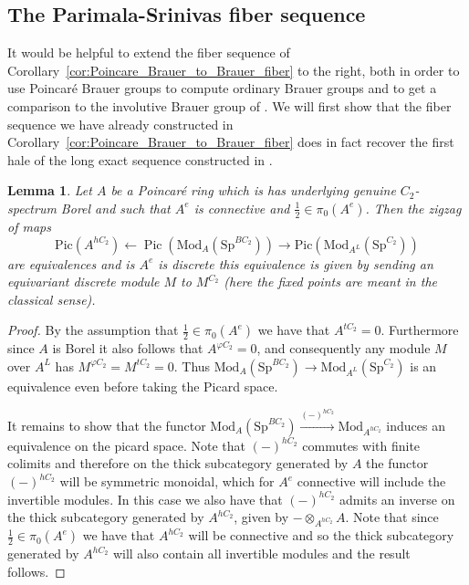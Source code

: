 \documentclass{article}
\DeclareMathOperator{\Pic}{Pic} %
\renewcommand{\phi}{\varphi}
\newcommand{\pic}{\ensuremath{\mathrm{Pic}}}
\newtheorem{lemma}[equation]{Lemma}
\theoremstyle{definition}
\begin{document}
\subsection{The Parimala-Srinivas fiber sequence}

It would be helpful to extend the fiber sequence of Corollary~\ref{cor:Poincare_Brauer_to_Brauer_fiber} to the right, both in order to use Poincar{\'e} Brauer groups to compute ordinary Brauer groups and to get a comparison to the involutive Brauer group of \cite{MR1162189}. We will first show that the fiber sequence we have already constructed in Corollary~\ref{cor:Poincare_Brauer_to_Brauer_fiber} does in fact recover the first hale of the long exact sequence constructed in \cite[Theorem 2]{MR1162189}.

\begin{lemma}
    Let $A$ be a Poincar{\'e} ring which is has underlying genuine $C_2$-spectrum Borel and such that $A^e$ is connective and $\frac{1}{2}\in \pi_0(A^e)$. Then the zigzag of maps \[\pic(A^{hC_2})\leftarrow \Pic(\mathrm{Mod}_{A}(\mathrm{Sp}^{BC_2}))\rightarrow \pic(\mathrm{Mod}_{A^L}(\mathrm{Sp}^{C_2}))\] are equivalences and is $A^e$ is discrete this equivalence is given by sending an equivariant discrete module $M$ to $M^{C_2}$ (here the fixed points are meant in the classical sense).
\end{lemma}
\begin{proof}
    By the assumption that $\frac{1}{2}\in \pi_0(A^e)$ we have that $A^{tC_2}=0$. Furthermore since $A$ is Borel it also follows that $A^{\phi C_2}=0$, and consequently any module $M$ over $A^L$ has $M^{\phi C_2}=M^{tC_2}=0$. Thus $\mathrm{Mod}_A(\mathrm{Sp}^{BC_2})\to \mathrm{Mod}_{A^L}(\mathrm{Sp}^{C_2})$ is an equivalence even before taking the Picard space.

    It remains to show that the functor $\mathrm{Mod}_A(\mathrm{Sp}^{BC_2})\xrightarrow{(-)^{hC_2}}\mathrm{Mod}_{A^{hC_2}}$ induces an equivalence on the picard space. Note that $(-)^{hC_2}$ commutes with finite colimits and therefore on the thick subcategory generated by $A$ the functor $(-)^{hC_2}$ will be symmetric monoidal, which for $A^e$ connective will include the invertible modules. In this case we also have that $(-)^{hC_2}$ admits an inverse on the thick subcategory generated by $A^{hC_2}$, given by $-\otimes_{A^{hC_2}}A$. Note that since $\frac{1}{2}\in \pi_0(A^e)$ we have that $A^{hC_2}$ will be connective and so the thick subcategory generated by $A^{hC_2}$ will also contain all invertible modules and the result follows. 
\end{proof}
\end{document}
